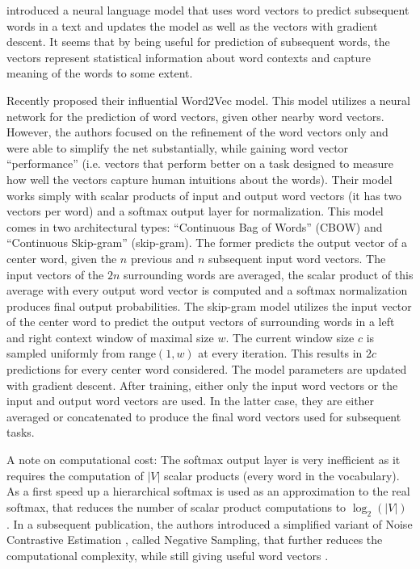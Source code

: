\citet{Bengio2003} introduced a neural language model that uses
word vectors to predict subsequent words in a text and updates the
model as well as the vectors with gradient descent. It seems that
by being useful for prediction of subsequent words, the vectors represent
statistical information about word contexts and capture meaning of
the words to some extent.

Recently \citet{Mikolov2013a} proposed their influential Word2Vec model.
This model utilizes a neural network for the prediction of word vectors,
given other nearby word vectors. However, the authors focused on the
refinement of the word vectors only and were able to simplify the
net substantially, while gaining word vector ``performance'' (i.e.
vectors that perform better on a task designed to measure how well
the vectors capture human intuitions about the words). Their model
works simply with scalar products of input and output word vectors
(it has two vectors per word) and a softmax output layer for normalization.
This model comes in two architectural types: ``Continuous Bag of Words''
(CBOW) and ``Continuous Skip-gram'' (skip-gram). The former predicts
the output vector of a center word, given the $n$ previous and
$n$ subsequent input word vectors. The input vectors of the $2n$
surrounding words are averaged, the scalar product of this average
with every output word vector is computed and a softmax normalization
produces final output probabilities. The skip-gram model utilizes
the input vector of the center word to predict the output vectors
of surrounding words in a left and right context window of maximal
size $w$. The current window size $c$ is sampled uniformly from
range$(1,w)$ at every iteration. This results in $2c$ predictions
for every center word considered. The model parameters are updated
with gradient descent. After training, either only the input word vectors
or the input and output word vectors are used. In the latter case, they are either averaged
or concatenated to produce the final word vectors used for subsequent
tasks. 

A note on computational cost: The softmax output layer is very inefficient
as it requires the computation of $|V|$ scalar products (every word
in the vocabulary). As a first speed up a hierarchical softmax \citep{Morin2005} is
used as an approximation to the real softmax, that reduces the number
of scalar product computations to $\log_{2}(|V|)$ \citep{Mikolov2013a}.
In a subsequent publication, the authors introduced a
simplified variant of Noise Contrastive Estimation \citep{Gutmann2012}, called
Negative Sampling, that further reduces the computational complexity,
while still giving useful word vectors \citep{Mikolov2013b}. 

